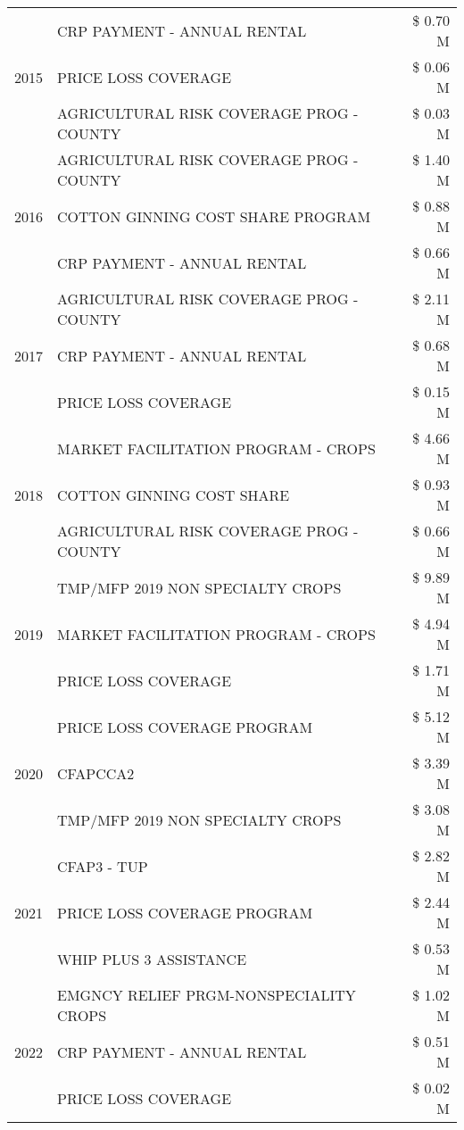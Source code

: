 \begin{tabular}{llr}
\cline{1-3}
\multirow[t]{3}{*}{2015} & CRP PAYMENT - ANNUAL RENTAL & \$ 0.70 M \\
 & PRICE LOSS COVERAGE & \$ 0.06 M \\
 & AGRICULTURAL RISK COVERAGE PROG - COUNTY & \$ 0.03 M \\
\cline{1-3}
\multirow[t]{3}{*}{2016} & AGRICULTURAL RISK COVERAGE PROG - COUNTY & \$ 1.40 M \\
 & COTTON GINNING COST SHARE PROGRAM & \$ 0.88 M \\
 & CRP PAYMENT - ANNUAL RENTAL & \$ 0.66 M \\
\cline{1-3}
\multirow[t]{3}{*}{2017} & AGRICULTURAL RISK COVERAGE PROG - COUNTY & \$ 2.11 M \\
 & CRP PAYMENT - ANNUAL RENTAL & \$ 0.68 M \\
 & PRICE LOSS COVERAGE & \$ 0.15 M \\
\cline{1-3}
\multirow[t]{3}{*}{2018} & MARKET FACILITATION PROGRAM - CROPS & \$ 4.66 M \\
 & COTTON GINNING COST SHARE & \$ 0.93 M \\
 & AGRICULTURAL RISK COVERAGE PROG - COUNTY & \$ 0.66 M \\
\cline{1-3}
\multirow[t]{3}{*}{2019} & TMP/MFP 2019 NON SPECIALTY CROPS & \$ 9.89 M \\
 & MARKET FACILITATION PROGRAM - CROPS & \$ 4.94 M \\
 & PRICE LOSS COVERAGE & \$ 1.71 M \\
\cline{1-3}
\multirow[t]{3}{*}{2020} & PRICE LOSS COVERAGE PROGRAM & \$ 5.12 M \\
 & CFAPCCA2 & \$ 3.39 M \\
 & TMP/MFP 2019 NON SPECIALTY CROPS & \$ 3.08 M \\
\cline{1-3}
\multirow[t]{3}{*}{2021} & CFAP3 - TUP & \$ 2.82 M \\
 & PRICE LOSS COVERAGE PROGRAM & \$ 2.44 M \\
 & WHIP PLUS 3 ASSISTANCE & \$ 0.53 M \\
\cline{1-3}
\multirow[t]{3}{*}{2022} & EMGNCY RELIEF PRGM-NONSPECIALITY CROPS & \$ 1.02 M \\
 & CRP PAYMENT - ANNUAL RENTAL & \$ 0.51 M \\
 & PRICE LOSS COVERAGE & \$ 0.02 M \\
\cline{1-3}
\bottomrule
\end{tabular}
